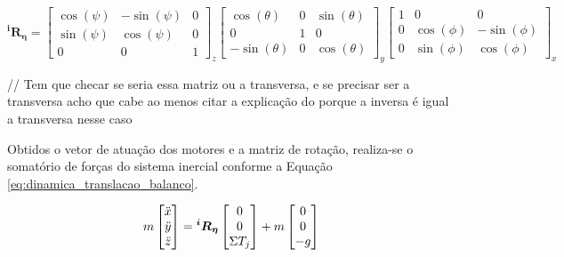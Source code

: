 \documentclass[main.tex]{subfiles}
\begin{document}
\begin{equation}\label{eq:rotational_matrix_raw}
    \boldsymbol{^iR_\eta} = 
     \begin{bmatrix}
        \cos(\psi)  &   -\sin(\psi) &   0\\
        \sin(\psi)  &   \cos(\psi)  &   0\\
        0           &   0           &   1
    \end{bmatrix}_z
    \begin{bmatrix}
        \cos(\theta)    &   0             &   \sin(\theta)  \\
        0               &   1               &   0           \\
        -\sin(\theta)   &   0             &   \cos(\theta)
    \end{bmatrix}_y
   \begin{bmatrix}
        1           &   0           &   0               \\
        0           &   \cos(\phi)  &   -\sin(\phi)   \\
        0           &   \sin(\phi)  &   \cos(\phi)
    \end{bmatrix}_x
\end{equation}

\textcolor{anotacao}{// Tem que checar se seria essa matriz ou a transversa, e se precisar ser a transversa acho que cabe ao menos citar a explicação do porque a inversa é igual a transversa nesse caso}

Obtidos o vetor de atuação dos motores e a matriz de rotação, realiza-se o somatório de forças do sistema inercial conforme a Equação \ref{eq:dinamica_translacao_balanco}.

\begin{equation}\label{eq:dinamica_translacao_balanco}
    m \begin{bmatrix}
        \Ddot{x}\\
        \Ddot{y}\\
        \Ddot{z}
    \end{bmatrix} = \boldsymbol{^iR_\eta}
    \begin{bmatrix}
        0\\
        0\\
        \Sigma T_j
    \end{bmatrix} + m
    \begin{bmatrix}
        0\\
        0\\
        -g
    \end{bmatrix}
\end{equation}
\end{document}
